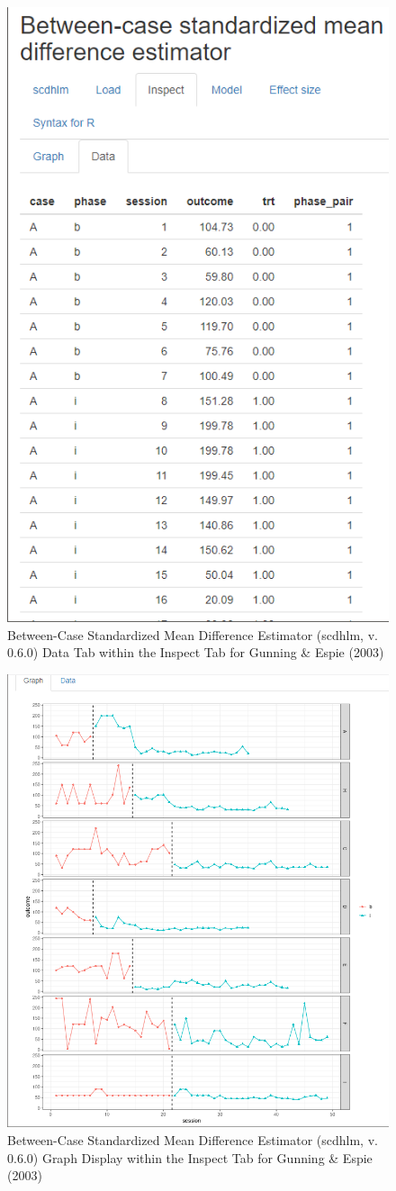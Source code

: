 \documentclass[
]{book}
\begin{document}
\begin{figure}
\includegraphics[width=0.6\linewidth]{images/app.inspect.data_GunningEspie2003} \caption{Between-Case Standardized Mean Difference Estimator (scdhlm, v. 0.6.0) Data Tab within the Inspect Tab for Gunning \& Espie (2003)}\label{fig:Gunning-2003-inspect-data}
\end{figure}

\begin{figure}
\includegraphics[width=0.6\linewidth]{images/app.inspect.graph_GunningEspie2003} \caption{Between-Case Standardized Mean Difference Estimator (scdhlm, v. 0.6.0) Graph Display within the Inspect Tab for Gunning \& Espie (2003)}\label{fig:Gunning-2003-inspect-graph}
\end{figure}
\end{document}
